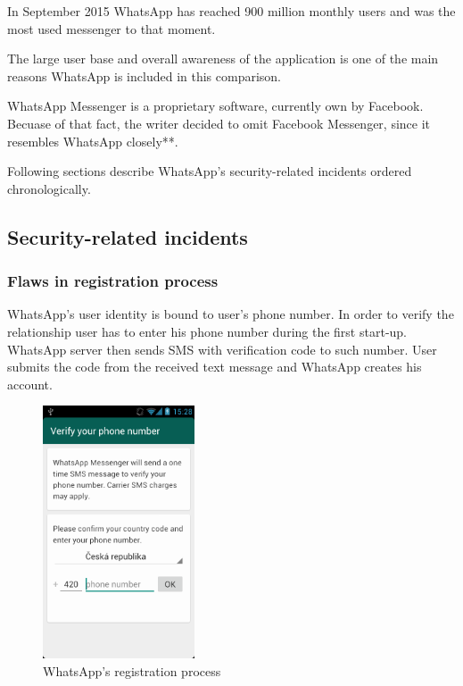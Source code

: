\documentclass[thesis=M,english]{FITthesis}[2012/10/20]
\begin{document}
In September 2015 WhatsApp has reached 900 million monthly users and was the most used messenger to that moment\cite{whatsappusers}.

The large user base and overall awareness of the application is one of the main reasons WhatsApp is included in this comparison.

WhatsApp Messenger is a proprietary software, currently own by Facebook\cite{facebookwhatsappbuy}. Becuase of that fact, the writer decided to omit Facebook Messenger, since it resembles WhatsApp closely**.

Following sections describe WhatsApp's security-related incidents ordered chronologically.

\subsection{Security-related incidents}

\subsubsection{Flaws in registration process}

WhatsApp's user identity is bound to user's phone number. In order to verify the relationship user has to enter his phone number during the first start-up. WhatsApp server then sends SMS with verification code to such number. User submits the code from the received text message and WhatsApp creates his account.  

\begin{figure}[htb]
	\centering
	\includegraphics[width=0.4\textwidth]{whatsapp-registration.png}
	\caption{WhatsApp's registration process}
	\label{img:whatsapp_reg}
\end{figure}
\end{document}
